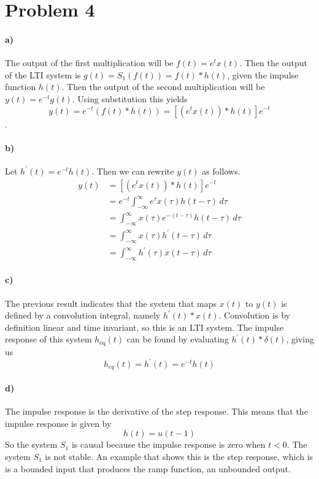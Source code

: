 \documentclass[12pt]{article}
\begin{document}
\section*{Problem 4}

\paragraph{a)}

The output of the first multiplication will be \(f(t)=e^tx(t)\). Then the output of the LTI system is \(g(t)=S_1(f(t))=f(t)*h(t)\), given the impulse function \(h(t)\). Then
the output of the second multiplication will be \(y(t)=e^{-t}g(t)\). Using substitution this yields
\[y(t)=e^{-t}(f(t)*h(t))=[(e^tx(t))*h(t)]e^{-t}\].

\paragraph{b)}

Let \(h^\prime(t)=e^{-t}h(t)\). Then we can rewrite \(y(t)\) as follows.
\begin{align*}
    y(t)&=[(e^tx(t))*h(t)]e^{-t}\\
    &=e^{-t}\int_{-\infty}^\infty e^\tau x(\tau) h(t-\tau)\, d\tau\\
    &=\int_{-\infty}^\infty x(\tau) e^{-(t-\tau)} h(t-\tau)\, d\tau\\
    &=\int_{-\infty}^\infty x(\tau) h^\prime(t-\tau)\, d\tau\\
    &=\int_{-\infty}^\infty h^\prime(\tau) x(t-\tau)\, d\tau
\end{align*}

\paragraph{c)}

The previous result indicates that the system that maps \(x(t)\) to \(y(t)\) is defined by a convolution integral, namely \(h^\prime(t)*x(t)\). Convolution is by definition linear and
time invariant, so this is an LTI system. The impulse response of this system \(h_\text{eq}(t)\) can be found by evaluating \(h^\prime(t)*\delta(t)\), giving us
\[h_{eq}(t)=h^\prime(t)=e^{-t}h(t)\]

\paragraph{d)}

The impulse response is the derivative of the step response. This means that the impulse response is given by
\[h(t)=u(t-1)\]
So the system \(S_1\) is causal because the impulse response is zero when \(t<0\). The system \(S_1\) is not stable. An example that shows this is the step response, which is is a bounded
input that produces the ramp function, an unbounded output.
\end{document}
